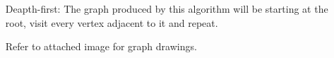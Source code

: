 \documentclass[letterpaper,11pt]{article}
\begin{document}
\begin{enumerate}
\begin{enumerate}
        \item [Deapth-first:] The graph produced by this algorithm will be starting at the root, visit every vertex adjacent to it and repeat.
        \item[] Refer to attached image for graph drawings.
    \end{enumerate}   
\end{enumerate}
\end{document}

